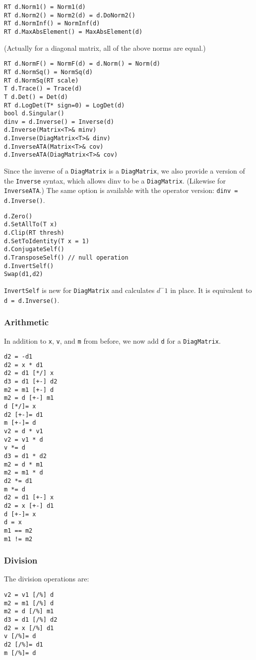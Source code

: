 \documentclass[twoside,letterpaper,11pt]{article}
\renewcommand{\tt}[1]{{\texttt {#1}}}
\begin{document}
\begin{verbatim}
RT d.Norm1() = Norm1(d)
RT d.Norm2() = Norm2(d) = d.DoNorm2()
RT d.NormInf() = NormInf(d)
RT d.MaxAbsElement() = MaxAbsElement(d)
\end{verbatim}
(Actually for a diagonal matrix, all of the above norms are equal.)
\begin{verbatim}
RT d.NormF() = NormF(d) = d.Norm() = Norm(d)
RT d.NormSq() = NormSq(d)
RT d.NormSq(RT scale)
T d.Trace() = Trace(d)
T d.Det() = Det(d)
RT d.LogDet(T* sign=0) = LogDet(d)
bool d.Singular()
dinv = d.Inverse() = Inverse(d)
d.Inverse(Matrix<T>& minv)
d.Inverse(DiagMatrix<T>& dinv)
d.InverseATA(Matrix<T>& cov)
d.InverseATA(DiagMatrix<T>& cov)
\end{verbatim}
Since the inverse of a \tt{DiagMatrix} is a \tt{DiagMatrix},
we also provide a version of the \tt{Inverse} syntax, which allows dinv
to be a \tt{DiagMatrix}.  (Likewise for \tt{InverseATA}.)  The same option is 
available with the operator version: \tt{dinv = d.Inverse()}.

\begin{verbatim}
d.Zero()
d.SetAllTo(T x)
d.Clip(RT thresh)
d.SetToIdentity(T x = 1)
d.ConjugateSelf()
d.TransposeSelf() // null operation
d.InvertSelf()
Swap(d1,d2)
\end{verbatim}
\tt{InvertSelf} is new for \tt{DiagMatrix} and calculates $d^-1$ in place.  
It is equivalent to \tt{d = d.Inverse()}.

\subsubsection{Arithmetic}

In addition to \tt{x}, \tt{v}, and \tt{m} from before, we now add \tt{d} for a \tt{DiagMatrix}.

\begin{verbatim}
d2 = -d1
d2 = x * d1
d2 = d1 [*/] x
d3 = d1 [+-] d2
m2 = m1 [+-] d
m2 = d [+-] m1
d [*/]= x
d2 [+-]= d1
m [+-]= d
v2 = d * v1
v2 = v1 * d
v *= d
d3 = d1 * d2
m2 = d * m1
m2 = m1 * d
d2 *= d1
m *= d
d2 = d1 [+-] x
d2 = x [+-] d1
d [+-]= x
d = x
m1 == m2
m1 != m2
\end{verbatim}

\subsubsection{Division}

The division operations are:
\begin{verbatim}
v2 = v1 [/%] d
m2 = m1 [/%] d
m2 = d [/%] m1
d3 = d1 [/%] d2
d2 = x [/%] d1
v [/%]= d
d2 [/%]= d1
m [/%]= d
\end{verbatim}
\end{document}
